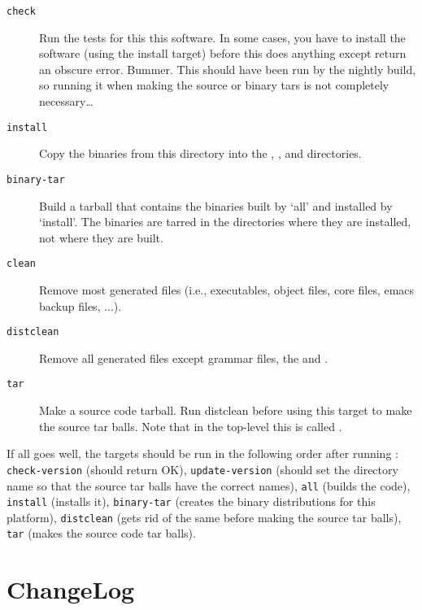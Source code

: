 \documentclass{dods-paper}
\begin{document}
\begin{description}
\item[\texttt{check}] Run the tests for this this software. In some cases,
  you have to install the software (using the install target) before this
  does anything except return an obscure error. Bummer. This should have
  been run by the nightly build, so running it when making the source or
  binary tars is not completely necessary\ldots

\item[\texttt{install}] Copy the binaries from this directory into the
  , ,  and  directories.

\item[\texttt{binary-tar}] Build a tarball that contains the binaries built
  by `all' and installed by `install'. The binaries are tarred in the
  directories where they are installed, not where they are built.

\item[\texttt{clean}] Remove most generated files (i.e., executables, object
  files, core files, emacs backup files, ...).

\item[\texttt{distclean}] Remove all generated files except grammar files,
  the  and .

\item[\texttt{tar}] Make a source code tarball. Run distclean before using
  this target to make the source tar balls. Note that in the top-level
   this is called .
\end{description}

If all goes well, the targets should be run in the following order after
running : \texttt{check-version} (should return OK),
\texttt{update-version} (should set the directory name so that the source tar
balls have the correct names), \texttt{all} (builds the code),
\texttt{install} (installs it), \texttt{binary-tar} (creates the binary
distributions for this platform), \texttt{distclean} (gets rid of the same
before making the source tar balls), \texttt{tar} (makes the source code tar
balls).

\section{ChangeLog}
\end{document}
